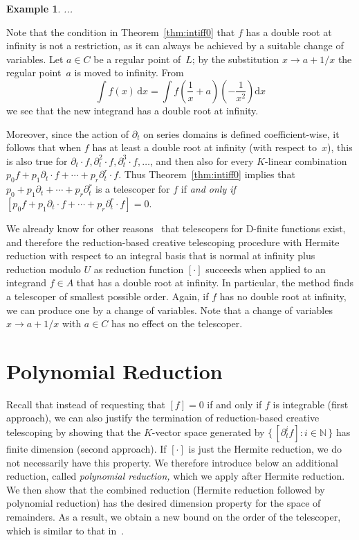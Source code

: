 \documentclass{sig-alternate}
\newtheorem{example}[theorem]{Example}
\let\set\mathbb
\begin{document}
\begin{example}
  ...
\end{example}

Note that the condition in Theorem~\ref{thm:intiff0} that $f$ has a double
root at infinity is not a restriction, as it can always be achieved by
a suitable change of variables. Let $a\in C$ be a regular point of~$L$; by
the substitution $x\to a+1/x$ the regular point~$a$ is moved to
infinity. From
\[
  \int f(x) \,\mathrm{d}x = \int f\left(\frac{1}{x}+a\right)\left(-\frac{1}{x^2}\right) \mathrm{d}x
\]
we see that the new integrand has a double root at infinity.

Moreover, since the action of $\partial_t$ on series domains is defined coefficient-wise,
it follows that when $f$ has at least a double root at infinity (with respect to~$x$),
this is also true for $\partial_t\cdot f, \partial_t^2\cdot f, \partial_t^3\cdot f,\dots$,
and then also for every $K$-linear combination $p_0f+p_1\partial_t\cdot f+\cdots+p_r\partial_t^r\cdot f$.
Thus Theorem~\ref{thm:intiff0} implies that $p_0+p_1\partial_t+\cdots+p_r\partial_t^r$
is a telescoper for $f$ if \emph{and only if}
$[p_0f+p_1\partial_t\cdot f+\cdots+p_r\partial_t^r\cdot f]=0$.

We already know for other reasons~\cite{Zeilberger1990,chyzak00} that
telescopers for D-finite functions exist, and therefore the reduction-based
creative telescoping procedure with Hermite reduction with respect to an
integral basis that is normal at infinity plus reduction modulo $U$
as reduction function $[\cdot]$ succeeds when applied to an integrand $f\in A$ that has a double root at infinity.
In particular, the method finds a telescoper of smallest possible order.
Again, if $f$ has no double root at infinity, we can produce one by a change of variables.
Note that a change of variables $x\to a+1/x$ with $a\in C$ has no effect on
the telescoper.

\section{Polynomial Reduction}\label{sec:polynomial}

Recall that instead of requesting that $[f]=0$ if and only if $f$ is integrable
(first approach), we can also justify the termination of reduction-based
creative telescoping by showing that the $K$-vector space generated by $\{\,[\partial_t^if]:i\in\set N\,\}$
has finite dimension (second approach). If $[\cdot]$ is just the Hermite
reduction, we do not necessarily have this property. We therefore introduce below an
additional reduction, called \emph{polynomial reduction,} which we apply after
Hermite reduction. We then show that the combined reduction (Hermite reduction
followed by polynomial reduction) has the desired dimension property for the
space of remainders. As a result, we obtain a new bound on the order of the
telescoper, which is similar to that in~\cite{chen14a}.
\end{document}
